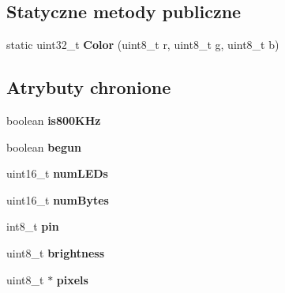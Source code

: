 \subsection*{Statyczne metody publiczne}
\begin{DoxyCompactItemize}
\item 
\mbox{\label{class_adafruit___neo_pixel_ac49f3c50948815d45cecccbc66453386}} 
static uint32\+\_\+t {\bfseries Color} (uint8\+\_\+t r, uint8\+\_\+t g, uint8\+\_\+t b)
\end{DoxyCompactItemize}
\subsection*{Atrybuty chronione}
\begin{DoxyCompactItemize}
\item 
\mbox{\label{class_adafruit___neo_pixel_a82470f2a4c8a1a96508a944243655a99}} 
boolean {\bfseries is800\+K\+Hz}
\item 
\mbox{\label{class_adafruit___neo_pixel_abe22724953dac6b9d4a7812dbbfbb8a4}} 
boolean {\bfseries begun}
\item 
\mbox{\label{class_adafruit___neo_pixel_ad8218520ee2ad574f805985ea2c2b0b6}} 
uint16\+\_\+t {\bfseries num\+L\+E\+Ds}
\item 
\mbox{\label{class_adafruit___neo_pixel_a89a4a144941744dc01c6e0072ad0f05d}} 
uint16\+\_\+t {\bfseries num\+Bytes}
\item 
\mbox{\label{class_adafruit___neo_pixel_a8675eb91907704255e57298aa58f3b0e}} 
int8\+\_\+t {\bfseries pin}
\item 
\mbox{\label{class_adafruit___neo_pixel_a983265c34a4008d2c7a9eeb12eebea84}} 
uint8\+\_\+t {\bfseries brightness}
\item 
\mbox{\label{class_adafruit___neo_pixel_a4e6ac139ed0d1938802aec87a465ad8b}} 
uint8\+\_\+t $\ast$ {\bfseries pixels}
\item 
\mbox{\label{class_adafruit___neo_pixel_a8275f74399aea225b25aed014d740c99}} 

\end{DoxyCompactItemize}
